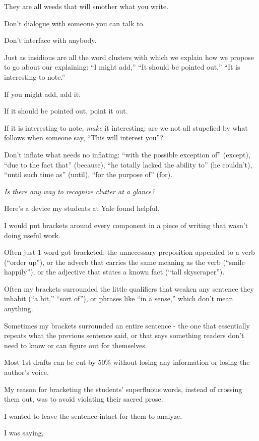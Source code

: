 \documentclass{book}
\numberwithin{equation}{section}
\begin{document}
They are all weeds that will smother what you write.

Don't dialogue with someone you can talk to.

Don't interface with anybody.

Just as insidious are all the word clusters with which we explain how we propose to go about our explaining: ``I might add,'' ``It should be pointed out,'' ``It is interesting to note.''

If you might add, add it.

If it should be pointed out, point it out.

If it is interesting to note, \textit{make} it interesting; are we not all stupefied by what follows when someone say, ``This will interest you''?

Don't inflate what needs no inflating: ``with the possible exception of'' (except), ``due to the fact that'' (because), ``he totally lacked the ability to'' (he couldn't), ``until such time as'' (until), ``for the purpose of'' (for).

\textit{Is there any way to recognize clutter at a glance?}

Here's a device my students at Yale found helpful.

I would put brackets around every component in a piece of writing that wasn't doing useful work.

Often just 1 word got bracketed: the unnecessary preposition appended to a verb (``order up''), or the adverb that carries the same meaning as the verb (``smile happily''), or the adjective that states a known fact (``tall skyscraper'').

Often my brackets surrounded the little qualifiers that weaken any sentence they inhabit (``a bit,'' ``sort of''), or phrases like ``in a sense,'' which don't mean anything.

Sometimes my brackets surrounded an entire sentence - the one that essentially repeats what the previous sentence said, or that says something readers don't need to know or can figure out for themselves.

Most 1st drafts can be cut by 50\% without losing any information or losing the author's voice.

%
My reason for bracketing the students' superfluous words, instead of crossing them out, was to avoid violating their sacred prose.

I wanted to leave the sentence intact for them to analyze.

I was saying,
\end{document}

